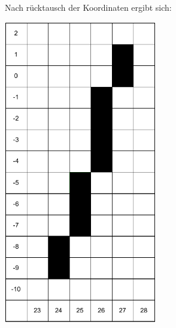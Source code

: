 \documentclass{article}
\begin{document}
Nach rücktausch der Koordinaten ergibt sich:
\begin{center}
    \includegraphics[width=0.5\textwidth,keepaspectratio]{KikusfuerCG.drawio.pdf}
\end{center}
\end{document}
